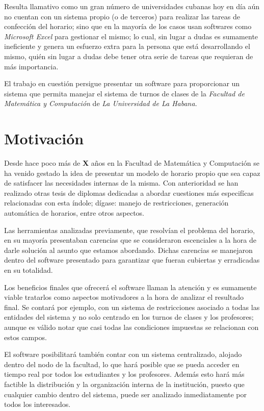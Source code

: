 \begin{introduction}
	Resulta llamativo como un gran número de universidades cubanas hoy en día aún no cuentan con un sistema propio (o de terceros) para realizar las tareas de confección del horario; sino que en la mayoría de los casos usan softwares como \textit{Microsoft Excel} para gestionar el mismo; lo cual, sin lugar a dudas es sumamente ineficiente y genera un esfuerzo extra para la persona que está desarrollando el mismo, quién sin lugar a dudas debe tener otra serie de tareas que requieran de más importancia.
	
	El trabajo en cuestión persigue presentar un software para proporcionar un sistema que permita manejar el sistema de turnos de clases de la \textit{Facultad de Matemática y Computación} de \textit{La Universidad de La Habana}.
	
	\section{Motivación}
	Desde hace poco más de \textbf{X} años en la Facultad de Matemática y Computación se ha venido gestado la idea de presentar un modelo de horario propio que sea capaz de satisfacer las necesidades internas de la misma. Con anterioridad se han realizado otras tesis de diplomas dedicadas a abordar cuestiones más especifícas relacionadas con esta índole; dígase: manejo de restricciones, generación automática de horarios, entre otros aspectos. 
	
	Las herramientas analizadas previamente, que resolvían el problema del horario, en su mayoría presentaban carencias que se consideraron escenciales a la hora de darle solución al asunto que estamos abordando. Dichas carencias se manejaron dentro del software presentado para garantizar que fueran cubiertas y erradicadas en su totalidad.
	
	Los beneficios finales que ofrecerá el software llaman la atención y es sumamente viable tratarlos como aspectos motivadores a la hora de analizar el resultado final. Se contará por ejemplo, con un sistema de restricciones asociado a todas las entidades del sistema y no solo centrado en los turnos de clases y los profesores; aunque es válido notar que casi todas las condiciones impuestas se relacionan con estos campos. 
	
	El software posibilitará también contar con un sistema centralizado, alojado dentro del nodo de la facultad, lo que hará posible que se pueda acceder en tiempo real por todos los estudiantes y los profesores. Además esto hará más factible la distribución y la organización interna de la institución, puesto que cualquier cambio dentro del sistema, puede ser analizado inmediatamente por todos los interesados.
	

\end{introduction}
